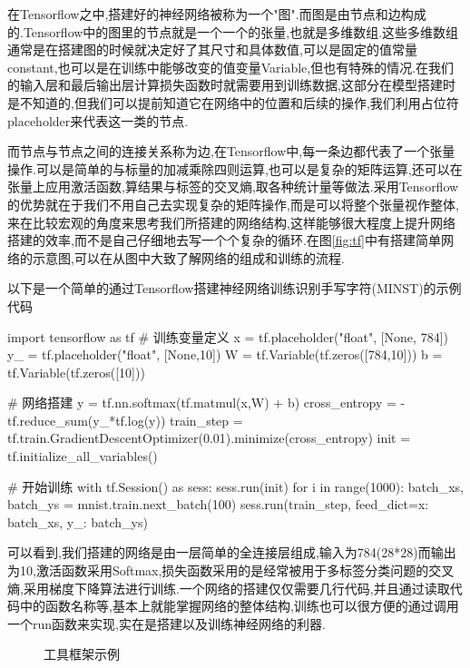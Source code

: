在Tensorflow之中,搭建好的神经网络被称为一个"图".而图是由节点和边构成的.Tensorflow中的图里的节点就是一个一个的张量,也就是多维数组.这些多维数组通常是在搭建图的时候就决定好了其尺寸和具体数值,可以是固定的值常量constant,也可以是在训练中能够改变的值变量Variable,但也有特殊的情况.在我们的输入层和最后输出层计算损失函数时就需要用到训练数据,这部分在模型搭建时是不知道的,但我们可以提前知道它在网络中的位置和后续的操作,我们利用占位符placeholder来代表这一类的节点.


而节点与节点之间的连接关系称为边,在Tensorflow中,每一条边都代表了一个张量操作.可以是简单的与标量的加减乘除四则运算,也可以是复杂的矩阵运算,还可以在张量上应用激活函数,算结果与标签的交叉熵,取各种统计量等做法.采用Tensorflow的优势就在于我们不用自己去实现复杂的矩阵操作,而是可以将整个张量视作整体,来在比较宏观的角度来思考我们所搭建的网络结构,这样能够很大程度上提升网络搭建的效率,而不是自己仔细地去写一个个复杂的循环.在图\ref{fig:tf}中有搭建简单网络的示意图,可以在从图中大致了解网络的组成和训练的流程.

以下是一个简单的通过Tensorflow搭建神经网络训练识别手写字符(MINST)的示例代码

\begin{python}
import tensorflow as tf
# 训练变量定义
x = tf.placeholder("float", [None, 784]) 
y_ = tf.placeholder("float", [None,10])
W = tf.Variable(tf.zeros([784,10]))
b = tf.Variable(tf.zeros([10]))

# 网络搭建
y = tf.nn.softmax(tf.matmul(x,W) + b)
cross_entropy = -tf.reduce_sum(y_*tf.log(y))
train_step = tf.train.GradientDescentOptimizer(0.01).minimize(cross_entropy)
init = tf.initialize_all_variables()

# 开始训练
with tf.Session() as sess:
	sess.run(init)
	for i in range(1000):
	  batch_xs, batch_ys = mnist.train.next_batch(100)
	  sess.run(train_step, feed_dict={x: batch_xs, y_: batch_ys})

\end{python}

可以看到,我们搭建的网络是由一层简单的全连接层组成,输入为784(28*28)而输出为10,激活函数采用Softmax,损失函数采用的是经常被用于多标签分类问题的交叉熵,采用梯度下降算法进行训练.一个网络的搭建仅仅需要几行代码,并且通过读取代码中的函数名称等,基本上就能掌握网络的整体结构,训练也可以很方便的通过调用一个run函数来实现,实在是搭建以及训练神经网络的利器.

\begin{figure}
  \centering
  \hspace{1in}
  \caption[工具框架示例]{工具框架示例}
  \label{fig:tf_gephi}
\end{figure}

